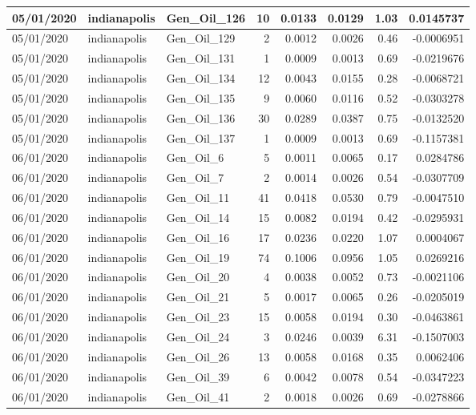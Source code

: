 \documentclass[
  letterpaper,
  DIV=11,
  numbers=noendperiod]{scrartcl}
\begin{document}
\begin{tabular}{l|l|l|r|r|r|r|r}
\hline
05/01/2020 & indianapolis & Gen\_Oil\_126 & 10 & 0.0133 & 0.0129 & 1.03 & 0.0145737\\
\hline
05/01/2020 & indianapolis & Gen\_Oil\_129 & 2 & 0.0012 & 0.0026 & 0.46 & -0.0006951\\
\hline
05/01/2020 & indianapolis & Gen\_Oil\_131 & 1 & 0.0009 & 0.0013 & 0.69 & -0.0219676\\
\hline
05/01/2020 & indianapolis & Gen\_Oil\_134 & 12 & 0.0043 & 0.0155 & 0.28 & -0.0068721\\
\hline
05/01/2020 & indianapolis & Gen\_Oil\_135 & 9 & 0.0060 & 0.0116 & 0.52 & -0.0303278\\
\hline
05/01/2020 & indianapolis & Gen\_Oil\_136 & 30 & 0.0289 & 0.0387 & 0.75 & -0.0132520\\
\hline
05/01/2020 & indianapolis & Gen\_Oil\_137 & 1 & 0.0009 & 0.0013 & 0.69 & -0.1157381\\
\hline
06/01/2020 & indianapolis & Gen\_Oil\_6 & 5 & 0.0011 & 0.0065 & 0.17 & 0.0284786\\
\hline
06/01/2020 & indianapolis & Gen\_Oil\_7 & 2 & 0.0014 & 0.0026 & 0.54 & -0.0307709\\
\hline
06/01/2020 & indianapolis & Gen\_Oil\_11 & 41 & 0.0418 & 0.0530 & 0.79 & -0.0047510\\
\hline
06/01/2020 & indianapolis & Gen\_Oil\_14 & 15 & 0.0082 & 0.0194 & 0.42 & -0.0295931\\
\hline
06/01/2020 & indianapolis & Gen\_Oil\_16 & 17 & 0.0236 & 0.0220 & 1.07 & 0.0004067\\
\hline
06/01/2020 & indianapolis & Gen\_Oil\_19 & 74 & 0.1006 & 0.0956 & 1.05 & 0.0269216\\
\hline
06/01/2020 & indianapolis & Gen\_Oil\_20 & 4 & 0.0038 & 0.0052 & 0.73 & -0.0021106\\
\hline
06/01/2020 & indianapolis & Gen\_Oil\_21 & 5 & 0.0017 & 0.0065 & 0.26 & -0.0205019\\
\hline
06/01/2020 & indianapolis & Gen\_Oil\_23 & 15 & 0.0058 & 0.0194 & 0.30 & -0.0463861\\
\hline
06/01/2020 & indianapolis & Gen\_Oil\_24 & 3 & 0.0246 & 0.0039 & 6.31 & -0.1507003\\
\hline
06/01/2020 & indianapolis & Gen\_Oil\_26 & 13 & 0.0058 & 0.0168 & 0.35 & 0.0062406\\
\hline
06/01/2020 & indianapolis & Gen\_Oil\_39 & 6 & 0.0042 & 0.0078 & 0.54 & -0.0347223\\
\hline
06/01/2020 & indianapolis & Gen\_Oil\_41 & 2 & 0.0018 & 0.0026 & 0.69 & -0.0278866\\

\end{tabular}
\end{document}
